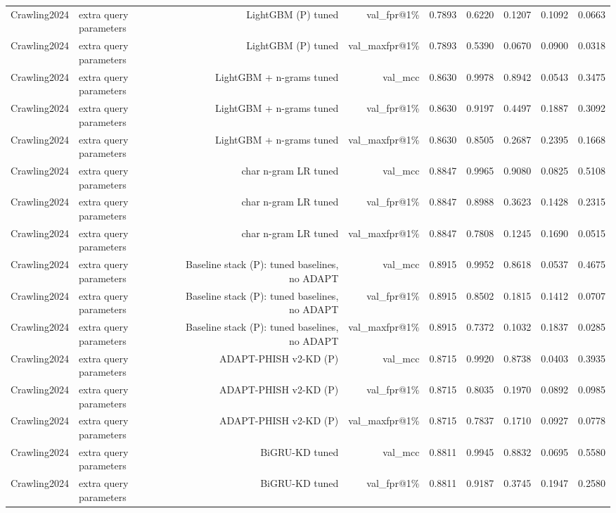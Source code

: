 \begin{table}[t]
\begin{tabular}{llrrrrrrr}
Crawling2024 & extra query parameters & LightGBM (P) tuned & val\_fpr@1\% & 0.7893 & 0.6220 & 0.1207 & 0.1092 & 0.0663 \\
Crawling2024 & extra query parameters & LightGBM (P) tuned & val\_maxfpr@1\% & 0.7893 & 0.5390 & 0.0670 & 0.0900 & 0.0318 \\
Crawling2024 & extra query parameters & LightGBM + n-grams tuned & val\_mcc & 0.8630 & 0.9978 & 0.8942 & 0.0543 & 0.3475 \\
Crawling2024 & extra query parameters & LightGBM + n-grams tuned & val\_fpr@1\% & 0.8630 & 0.9197 & 0.4497 & 0.1887 & 0.3092 \\
Crawling2024 & extra query parameters & LightGBM + n-grams tuned & val\_maxfpr@1\% & 0.8630 & 0.8505 & 0.2687 & 0.2395 & 0.1668 \\
Crawling2024 & extra query parameters & char n-gram LR tuned & val\_mcc & 0.8847 & 0.9965 & 0.9080 & 0.0825 & 0.5108 \\
Crawling2024 & extra query parameters & char n-gram LR tuned & val\_fpr@1\% & 0.8847 & 0.8988 & 0.3623 & 0.1428 & 0.2315 \\
Crawling2024 & extra query parameters & char n-gram LR tuned & val\_maxfpr@1\% & 0.8847 & 0.7808 & 0.1245 & 0.1690 & 0.0515 \\
Crawling2024 & extra query parameters & Baseline stack (P): tuned baselines, no ADAPT & val\_mcc & 0.8915 & 0.9952 & 0.8618 & 0.0537 & 0.4675 \\
Crawling2024 & extra query parameters & Baseline stack (P): tuned baselines, no ADAPT & val\_fpr@1\% & 0.8915 & 0.8502 & 0.1815 & 0.1412 & 0.0707 \\
Crawling2024 & extra query parameters & Baseline stack (P): tuned baselines, no ADAPT & val\_maxfpr@1\% & 0.8915 & 0.7372 & 0.1032 & 0.1837 & 0.0285 \\
Crawling2024 & extra query parameters & ADAPT-PHISH v2-KD (P) & val\_mcc & 0.8715 & 0.9920 & 0.8738 & 0.0403 & 0.3935 \\
Crawling2024 & extra query parameters & ADAPT-PHISH v2-KD (P) & val\_fpr@1\% & 0.8715 & 0.8035 & 0.1970 & 0.0892 & 0.0985 \\
Crawling2024 & extra query parameters & ADAPT-PHISH v2-KD (P) & val\_maxfpr@1\% & 0.8715 & 0.7837 & 0.1710 & 0.0927 & 0.0778 \\
Crawling2024 & extra query parameters & BiGRU-KD tuned & val\_mcc & 0.8811 & 0.9945 & 0.8832 & 0.0695 & 0.5580 \\
Crawling2024 & extra query parameters & BiGRU-KD tuned & val\_fpr@1\% & 0.8811 & 0.9187 & 0.3745 & 0.1947 & 0.2580 \\

\end{tabular}
\end{table}
